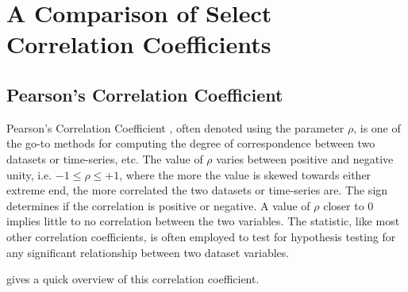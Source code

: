 \section{A Comparison of Select Correlation Coefficients}

\subsection*{Pearson's Correlation Coefficient}

Pearson's Correlation Coefficient \cite{pearsonCorrCoeff}, often denoted using the parameter $\rho$, is one of the go-to methods for computing the degree of correspondence between two datasets or time-series, etc. The value of $\rho$ varies between positive and negative unity, i.e. $-1 \leq \rho \leq +1$, where the more the value is skewed towards either extreme end, the more correlated the two datasets or time-series are. The sign determines if the correlation is positive or negative. A value of $\rho$ closer to $0$ implies little to no correlation between the two variables. The statistic, like most other correlation coefficients, is often employed to test for hypothesis testing for any significant relationship between two dataset variables.

 gives a quick overview of this correlation coefficient.

